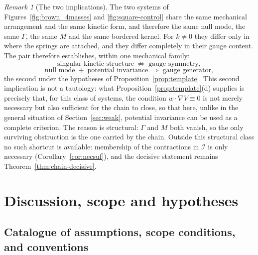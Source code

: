 \documentclass[12pt]{article}
\theoremstyle{plain}
\theoremstyle{definition}
\theoremstyle{remark}
\newtheorem{remark}[theorem]{Remark}
\newcommand{\Ical}{\mathcal{I}}
\begin{document}
	\begin{remark}[The two implications]
		\label{rem:twoimplications}
		The two systems of Figures~\ref{fig:brown_4masses} and
		\ref{fig:square-control} share the same mechanical arrangement and the same
		kinetic form, and therefore the same null mode, the same $\Gamma$, the same $M$
		and the same bordered kernel. For $k\neq0$ they differ only in where the
		springs are attached, and they differ completely in their gauge content. The pair therefore establishes, within one
		mechanical family:
		\[
		\text{singular kinetic structure}\;\nRightarrow\;\text{gauge symmetry},
		\]
		\[
		\text{null mode}\;+\;\text{potential invariance}
		\;\Longrightarrow\;\text{gauge generator},
		\]
		the second under the hypotheses of Proposition~\ref{prop:template}.
		This second implication is not a tautology: what
		Proposition~\ref{prop:template}(d) supplies is precisely that, for this class of
		systems, the condition $w\!\cdot\!\nabla V\equiv0$ is not merely necessary but
		also sufficient for the chain to close, so that here, unlike in the general
		situation of Section~\ref{sec:weak}, potential invariance can be used as a
		complete criterion. The reason is structural: $\Gamma$ and $M$ both vanish, so
		the only surviving obstruction is the one carried by the chain. Outside this
		structural class no such shortcut is available: membership of the
		contractions in $\Ical$ is only necessary
		(Corollary~\ref{cor:necsuf}), and the decisive statement remains
		Theorem~\ref{thm:chain-decisive}.
	\end{remark}
	
	\section{Discussion, scope and hypotheses}
	\label{sec:scope}
	
	\subsection{Catalogue of assumptions, scope conditions, and conventions}
	
\end{document}
